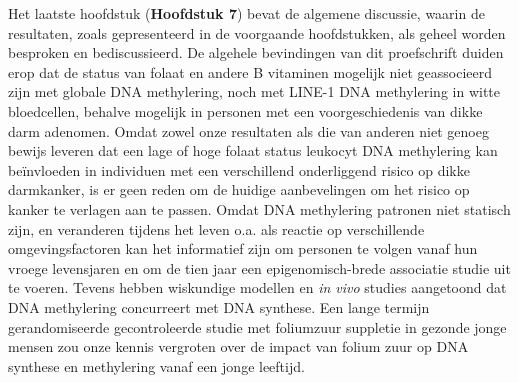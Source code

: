 \noindent Het laatste hoofdstuk (\textbf{Hoofdstuk 7}) bevat de algemene discussie, waarin de resultaten, zoals gepresenteerd in de voorgaande hoofdstukken, als geheel worden besproken en bediscussieerd. De algehele bevindingen van dit proefschrift duiden erop dat de status van folaat en andere B vitaminen mogelijk niet geassocieerd zijn met globale DNA methylering, noch met LINE-1 DNA methylering in witte bloedcellen, behalve mogelijk in personen met een voorgeschiedenis van dikke darm adenomen. Omdat zowel onze resultaten als die van anderen niet genoeg bewijs leveren dat een lage of hoge folaat status leukocyt DNA methylering kan be\"invloeden in individuen met een verschillend onderliggend risico op dikke darmkanker, is er geen reden om de huidige aanbevelingen om het risico op kanker te verlagen aan te passen. Omdat DNA methylering patronen niet statisch zijn, en veranderen tijdens het leven o.a. als reactie op verschillende omgevingsfactoren kan het informatief zijn om personen te volgen vanaf hun vroege levensjaren en om de tien jaar een epigenomisch-brede associatie studie uit te voeren. Tevens hebben wiskundige modellen en \emph{in vivo} studies aangetoond dat DNA methylering concurreert met DNA synthese. Een lange termijn gerandomiseerde gecontroleerde studie met foliumzuur suppletie in gezonde jonge mensen zou onze kennis vergroten over de impact van folium zuur op DNA synthese en methylering vanaf een jonge leeftijd. 